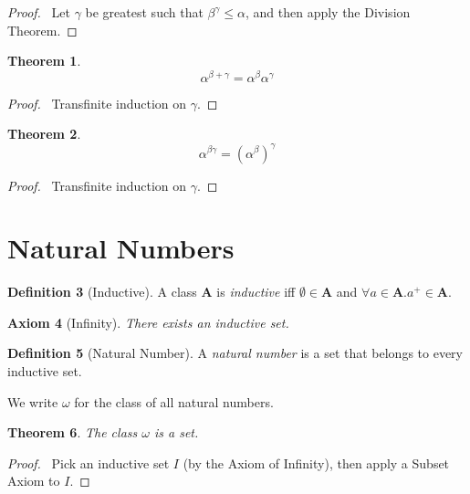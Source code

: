 \documentclass{article}
\let\qed\relax
\newtheorem{axiom}{Axiom}
\newtheorem{theorem}[axiom]{Theorem}
\theoremstyle{definition}
\newtheorem{definition}[axiom]{Definition}
\begin{document}
    \begin{proof}
        \pf\ Let $\gamma$ be greatest such that $\beta^\gamma \leq \alpha$, and then apply the Division Theorem. \qed
    \end{proof}
    
    \begin{theorem}
        \[ \alpha^{\beta + \gamma} = \alpha^\beta \alpha^\gamma \]
    \end{theorem}

    \begin{proof}
        \pf\ Transfinite induction on $\gamma$. \qed
    \end{proof}

    \begin{theorem}
        \[ \alpha^{\beta \gamma} = (\alpha^\beta)^\gamma \]
    \end{theorem}

    \begin{proof}
        \pf\ Transfinite induction on $\gamma$. \qed
    \end{proof}

    \section{Natural Numbers}

    \begin{definition}[Inductive]
        A class $\mathbf{A}$ is \emph{inductive} iff $\emptyset \in \mathbf{A}$ and
        $\forall a \in \mathbf{A}. a^+ \in \mathbf{A}$.
    \end{definition}

    \begin{axiom}[Infinity]
        There exists an inductive set.
    \end{axiom}

    \begin{definition}[Natural Number]
        A \emph{natural number} is a set that belongs to every inductive set.

        We write $\omega$ for the class of all natural numbers.
    \end{definition}

    \begin{theorem}
        The class $\omega$ is a set.
    \end{theorem}

    \begin{proof}
        \pf\ Pick an inductive set $I$ (by the Axiom of Infinity), then apply a Subset Axiom to $I$. \qed
    \end{proof}
\end{document}
